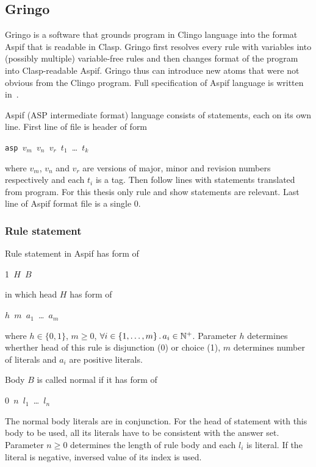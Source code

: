 \documentclass[
    digital,
    color,
    oneside,
    sansbold,
    lot,
    nolof
]{fithesis}
\begin{document}
\subsection{Gringo}

Gringo is a software that grounds program in Clingo language into the format
Aspif that is readable in Clasp. Gringo first resolves every rule with variables
into (possibly multiple) variable-free rules and then changes format of
the program into Clasp-readable Aspif. Gringo thus can introduce new atoms
that were not obvious from the Clingo program. Full specification of Aspif language
is written in~\cite{aspEasy2016}.

Aspif (ASP intermediate format) language consists of statements, each on its own
line. First line of file is header of form 
{%
\newcommand{\ms}{\texttt{ }}
\begin{center}
    \texttt{asp}\ms$v_m$\ms$v_n$\ms$v_r$\ms$t_1$\ms\dots\ms$t_k$
\end{center}
}\noindent
where $v_m$, $v_n$ and $v_r$ are versions of major, minor and revision numbers
respectively and each $t_i$ is a tag. Then follow lines with statements
translated from program. For this thesis only rule and show statements
are relevant.
Last line of Aspif format file is a single 0.

\subsubsection{Rule statement}

Rule statement in Aspif has form of
{%
\newcommand{\ms}{\texttt{ }}
\begin{center}
    1\ms{}$H$\ms{}$B$
\end{center}
}\noindent
in which head $H$ has form of
{%
\newcommand{\ms}{\texttt{ }}
\begin{center}
    $h$\ms$m$\ms$a_1$\ms\dots\ms$a_m$
\end{center}
}\noindent
where $h\in\{0, 1\}$, $m\geq 0$,
$\forall i\in\{1, \dots, m\}\,.\, a_i\in\mathbb{N}^+$. Parameter $h$ determines
wherther head of this rule is disjunction (0) or choice (1), $m$
determines number of literals and $a_i$ are positive literals.

Body $B$ is called normal if it has form of
{%
\newcommand{\ms}{\texttt{ }}
\begin{center}
    0\ms$n$\ms$l_1$\ms\dots\ms$l_n$
\end{center}
}\noindent
The normal body literals are in conjunction. For the head of statement with
this body to be used, all its literals have to be consistent with the answer set.
Parameter $n\geq 0$ determines
the length of rule body and each $l_i$ is literal. If the literal is negative,
inversed value of its index is used.
\end{document}
